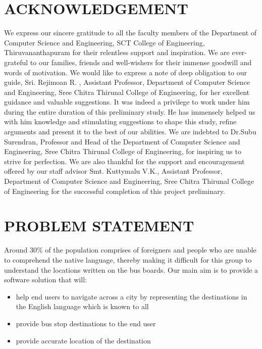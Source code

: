 \documentclass[a4paper,12pt]{report}
\begin{document}
\renewcommand\chaptername{CHAPTER}
\chapter{ACKNOWLEDGEMENT}
We express our sincere gratitude to all the faculty members of the Department of Computer Science and Engineering, SCT College of Engineering, Thiruvananthapuram for their relentless support and inspiration. We are ever-grateful to our families, friends and well-wishers for their immense goodwill and words of motivation.
We would like to express a note of deep obligation to our guide, Sri. Rejimoan R. , Assistant Professor, Department of Computer Science and Engineering, Sree Chitra Thirunal College of Engineering, for her excellent guidance and valuable suggestions. It was indeed a privilege to work under him during the entire duration of this preliminary study. He has immensely helped us with him knowledge and stimulating suggestions to shape this study, reﬁne arguments and present it to the best of our abilities.
We are indebted to Dr.Subu Surendran, Professor and Head of the Department of Computer Science and Engineering, Sree Chitra Thirunal College of Engineering, for inspiring us to strive for perfection. We are also thankful for the support and encouragement oﬀered by our staﬀ advisor Smt. Kuttymalu V.K., Assistant Professor, Department of Computer Science and Engineering, Sree Chitra Thirunal College of Engineering for the successful completion of this project preliminary.



\newpage
\renewcommand\chaptername{CHAPTER}
\chapter{PROBLEM STATEMENT}
Around 30\% of the population comprises of foreigners and people who are unable to comprehend the native language, thereby making it difficult for this group to understand the locations written on the bus boards. Our main aim is to provide a software solution that will:

\begin{itemize}
\item  help end users to navigate across a city by representing the destinations in the English language which is known to all
\item  provide bus stop destinations to the end user
\item  provide accurate location of the destination
\end{itemize}
\end{document}
